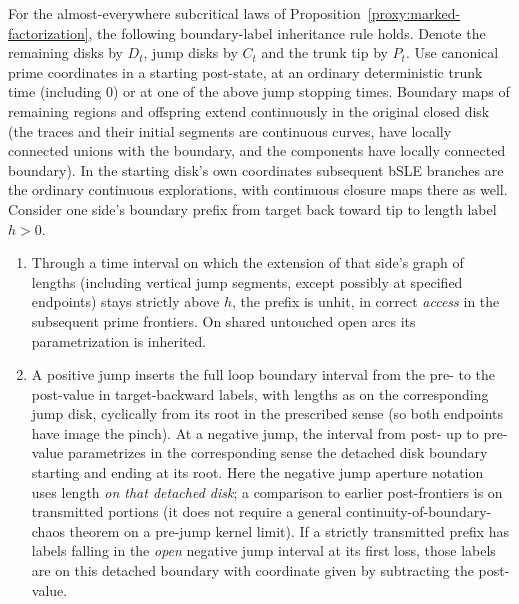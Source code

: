 \begin{lemma}\label{proxy:stack-rule}

For the almost-everywhere subcritical laws of Proposition~\ref{proxy:marked-factorization}, the following boundary-label inheritance rule holds.
Denote the remaining disks by \(D_t\), jump disks by \(C_t\) and the trunk tip by \(P_t\).
Use canonical prime coordinates in a starting post-state, at an ordinary deterministic trunk time (including 0) or at one of the above jump stopping times.
Boundary maps of remaining regions and offspring extend continuously in the original closed disk (the traces and their initial segments are continuous curves, have locally connected unions with the boundary, and the components have locally connected boundary).
In the starting disk's own coordinates subsequent bSLE branches are the ordinary continuous explorations, with continuous closure maps there as well.
Consider one side's boundary prefix from target back toward tip to length label \(h>0\).

\begin{enumerate}

\item Through a time interval on which the extension of that side's graph of lengths (including vertical jump segments, except possibly at specified endpoints) stays strictly above \(h\), the prefix is unhit, in correct \emph{access} in the subsequent prime frontiers.
On shared untouched open arcs its parametrization is inherited.

\item A positive jump inserts the full loop boundary interval from the pre- to the post-value in target-backward labels, with lengths as on the corresponding jump disk, cyclically from its root in the prescribed sense (so both endpoints have image the pinch).
At a negative jump, the interval from post- up to pre-value parametrizes in the corresponding sense the detached disk boundary starting and ending at its root.
Here the negative jump aperture notation uses length \emph{on that detached disk}; a comparison to earlier post-frontiers is on transmitted portions (it does not require a general continuity-of-boundary-chaos theorem on a pre-jump kernel limit).
If a strictly transmitted prefix has labels falling in the \emph{open} negative jump interval at its first loss, those labels are on this detached boundary with coordinate given by subtracting the post-value.

\end{enumerate}


\end{lemma}
